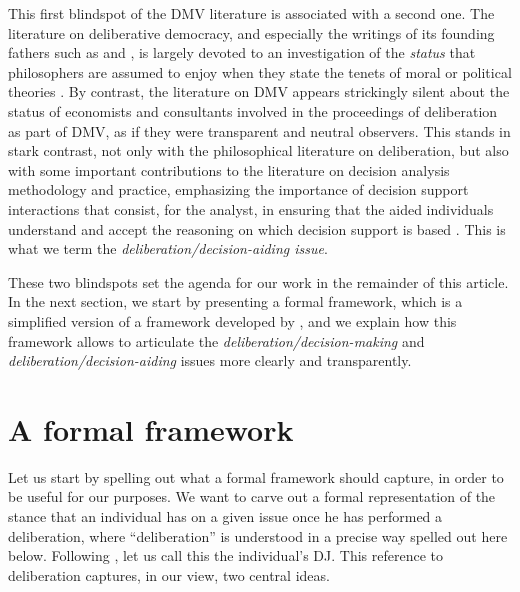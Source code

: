 \documentclass[version=3.21, pagesize, twoside=off, bibliography=totoc, DIV=calc, fontsize=12pt, a4paper, french, english]{scrartcl}
\begin{document}
This first blindspot of the DMV literature is associated with a second one. The literature on deliberative democracy, and especially the writings of its founding fathers such as \citet{rawls_political_2005} and \citet{habermas_faktizitat_1992}, is largely devoted to an investigation of the \emph{status} that philosophers are assumed to enjoy when they state the tenets of moral or political theories \citep{meinard_du_2014}. 
By contrast, the literature on DMV appears strickingly silent about the status of economists and consultants involved in the proceedings of deliberation as part of DMV, as if they were transparent and neutral observers. 
This stands in stark contrast, not only with the philosophical literature on deliberation, but also with some important contributions to the literature on decision analysis methodology and practice, emphasizing the importance of decision support interactions that consist, for the analyst, in ensuring that the aided individuals understand and accept the reasoning on which decision support is based \citep{roy_multicriteria_1996}. 
This is what we term the \emph{deliberation/decision-aiding issue}.

These two blindspots set the agenda for our work in the remainder of this article. 
In the next section, we start by presenting a formal framework, which is a simplified version of a framework developed by \citet{cailloux_formal_2018}, and we explain how this framework allows to articulate the \emph{deliberation/decision-making} and \emph{deliberation/decision-aiding} issues more clearly and transparently. 

\section{A formal framework}
Let us start by spelling out what a formal framework should capture, in order to be useful for our purposes. 
We want to carve out a formal representation of the stance that an individual has on a given issue once he has performed a deliberation, where “deliberation” is understood in a precise way spelled out here below. 
Following \citet{cailloux_formal_2018}, let us call this the individual's \ac{DJ}. 
This reference to deliberation captures, in our view, two central ideas.
\end{document}
